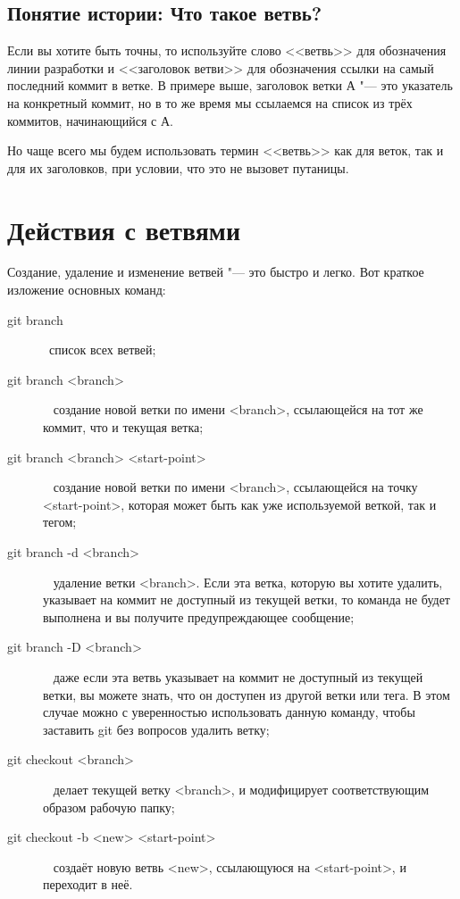 \documentclass[a4paper, 12pt]{report}
\begin{document}
\subsection{Понятие истории: Что такое ветвь?}

Если вы хотите быть точны, то используйте слово <<ветвь>> для обозначения линии
разработки и <<заголовок ветви>> для обозначения ссылки на самый последний коммит
в ветке. В примере выше, заголовок ветки А "--- это указатель на конкретный коммит,
но в то же время мы ссылаемся на список из трёх коммитов, начинающийся с А.

Но чаще всего мы будем использовать термин <<ветвь>> как для веток, так и для
их заголовков, при условии, что это не вызовет путаницы.


\section{Действия с ветвями}

Создание, удаление и изменение ветвей "--- это быстро и легко. Вот краткое изложение
основных команд:

\begin{description}

\item[git branch] \ 
\linebreak список всех ветвей;

\item[git branch <branch>] \ \linebreak
создание новой ветки по имени <branch>, ссылающейся на тот же коммит, 
что и текущая ветка;

\item[git branch <branch> <start-point>] \ \linebreak
создание новой ветки по имени <branch>, ссылающейся на точку <start-point>,
которая может быть как уже используемой веткой, так и тегом;

\item[git branch -d <branch>] \ \linebreak
удаление ветки <branch>. Если эта ветка, которую вы хотите удалить, 
указывает на коммит не доступный из текущей ветки, то команда не будет выполнена
и вы получите предупреждающее сообщение;

\item[git branch -D <branch>] \ \linebreak
даже если эта ветвь указывает на коммит не доступный из текущей ветки, вы можете
знать, что он доступен из другой ветки или тега. В этом случае можно с уверенностью
использовать данную команду, чтобы заставить git без вопросов удалить ветку;

\item[git checkout <branch>] \ \linebreak
делает текущей ветку <branch>, и модифицирует соответствующим образом рабочую
папку;

\item[git checkout -b <new> <start-point>] \ \linebreak
создаёт новую ветвь <new>, ссылающуюся на <start-point>, и переходит в неё.

\end{description}
\end{document}
